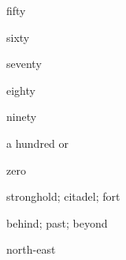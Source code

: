 \begin{flashcard}{\LARGE fifty}
\LARGE {}
\end{flashcard}
\begin{flashcard}{\LARGE sixty}
\LARGE {}
\end{flashcard}
\begin{flashcard}{\LARGE seventy}
\LARGE {}
\end{flashcard}
\begin{flashcard}{\LARGE eighty}
\LARGE {}
\end{flashcard}
\begin{flashcard}{\LARGE ninety}
\LARGE {}
\end{flashcard}
\begin{flashcard}{\LARGE a hundred}
\LARGE {} or 
\end{flashcard}
\begin{flashcard}{\LARGE zero}
\LARGE {}
\end{flashcard}
\begin{flashcard}{\LARGE stronghold; citadel; fort}
\LARGE {}
\end{flashcard}
\begin{flashcard}{\LARGE behind; past; beyond}
\LARGE {}
\end{flashcard}
\begin{flashcard}{\LARGE north-east}
\LARGE {}
\end{flashcard}

